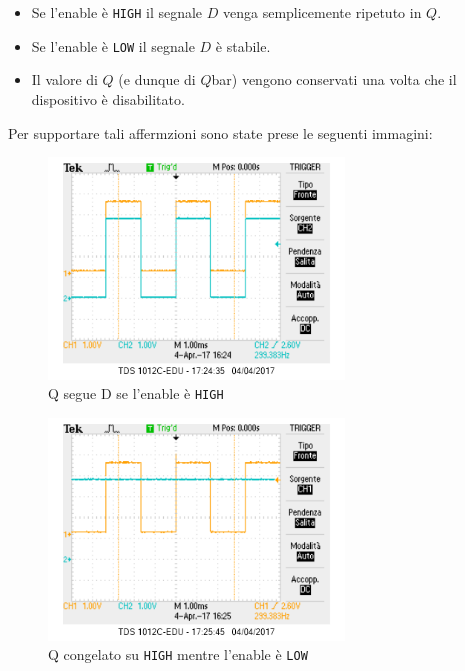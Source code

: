 \documentclass[a4paper,10pt]{article}
\def\code#1{\texttt{#1}}
\begin{document}
\begin{itemize}
\item Se l'enable è \code{HIGH} il segnale $D$ venga semplicemente ripetuto in $Q$.
\item Se l'enable è \code{LOW} il segnale $D$ è stabile.
\item Il valore di $Q$ (e dunque di $Q$bar) vengono conservati una volta che il dispositivo è disabilitato.
\end{itemize}

Per supportare tali affermzioni sono state prese le seguenti immagini:


\begin{figure}[H]
	\centering
	\includegraphics[width=0.7\textwidth]{../grafici/enableUp.png}
	\caption{Q segue D se l'enable è \code{HIGH}}
	\label{fig:FFD}
\end{figure}

\begin{figure}[H]
	\centering
	\includegraphics[width=0.7\textwidth]{../grafici/EnableDown0.png}
	\caption{Q congelato su \code{HIGH} mentre l'enable è \code{LOW}}
	\label{fig:FFD}
\end{figure}
\end{document}

